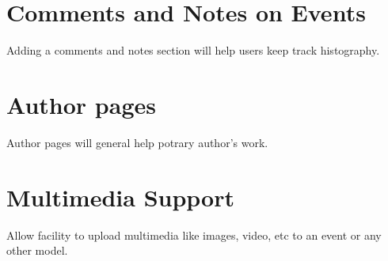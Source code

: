 \section{Comments and Notes on Events}
Adding a comments and notes section will help users keep track histography.

\section{Author pages}
Author pages will general help potrary author's work.

\section{Multimedia Support}
Allow facility to upload multimedia like images, video, etc to an event or any other model.